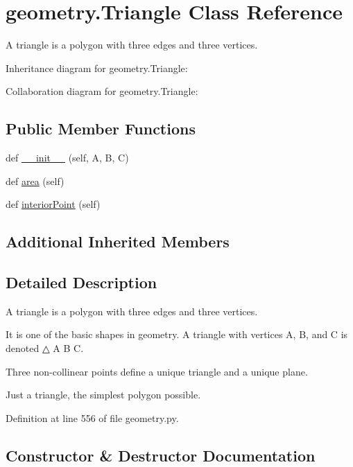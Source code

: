 \hypertarget{classgeometry_1_1Triangle}{}\section{geometry.\+Triangle Class Reference}
\label{classgeometry_1_1Triangle}


A triangle is a polygon with three edges and three vertices.  




Inheritance diagram for geometry.\+Triangle\+:


Collaboration diagram for geometry.\+Triangle\+:
\subsection*{Public Member Functions}
\begin{DoxyCompactItemize}
\item 
def \hyperlink{classgeometry_1_1Triangle_a4e7dfc53b80ea22d888ed43d9b401cf5}{\+\_\+\+\_\+init\+\_\+\+\_\+} (self, A, B, C)
\item 
def \hyperlink{classgeometry_1_1Triangle_aefd0596cf3d91438d5214c303d426bc6}{area} (self)
\item 
def \hyperlink{classgeometry_1_1Triangle_a714f4af89b1855e957797e2c53568893}{interior\+Point} (self)
\end{DoxyCompactItemize}
\subsection*{Additional Inherited Members}


\subsection{Detailed Description}
A triangle is a polygon with three edges and three vertices. 

It is one of the basic shapes in geometry. A triangle with vertices A, B, and C is denoted △ A B C.

Three non-\/collinear points define a unique triangle and a unique plane.\begin{DoxyVerb}Just a triangle, the simplest polygon possible.\end{DoxyVerb}
 

Definition at line 556 of file geometry.\+py.



\subsection{Constructor \& Destructor Documentation}
